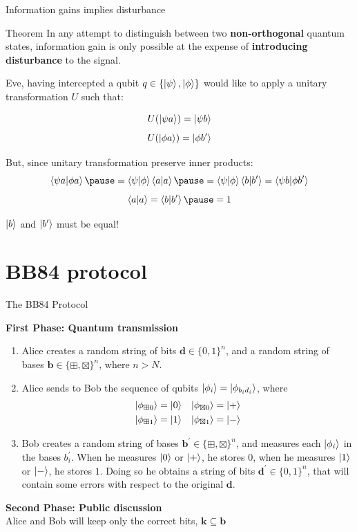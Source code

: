 \documentclass{beamer}
\newcommand{\comp}{\boxplus}
\newcommand{\diag}{\boxtimes}
\newcommand{\kz}{\ket{0}}
\newcommand{\ko}{\ket{1}}
\newcommand{\kpl}{\ket{+}}
\newcommand{\km}{\ket{-}}
\begin{document}
\begin{frame}{Information gains implies disturbance}
	
	\begin{block}{Theorem}
	In any attempt to
distinguish between two \textbf{non-orthogonal} quantum states, information gain is only
possible at the expense of \textbf{introducing disturbance} to the signal.

	\end{block}	
	
	Eve, having intercepted a qubit $q \in \{\ket{\psi}, \ket{\phi}\}$  would like to apply a unitary transformation  $U$ such that:
	
	\[
		U(\ket{\psi a}) = \ket{\psi b}
	\]\[
		U(\ket{\phi a}) = \ket{\phi b^\prime}
	\]
	
	\pause
	But, since unitary transformation preserve inner products:
	\[
	\braket{\psi a | \phi a} \pause = 
	\braket{\psi|\phi}\braket{a|a} \pause =
	\braket{\psi|\phi}\braket{b|b^\prime} = 
	\braket{\psi b|\phi b^\prime}
	\]
	\pause
	\vspace*{-0.5cm}
	\[
	\braket{a|a} = \braket{b|b^\prime} \pause = 1
	\]
	\pause
	\vspace*{-0.6cm}
	\begin{center}
	$\ket{b}$ and $\ket{b^\prime}$ must be equal!
	\end{center}
	\end{frame}

\section{BB84 protocol}
\begin{frame}{The BB84 Protocol}%

	\textbf{First Phase: Quantum transmission}
	\begin{enumerate}
		\item Alice creates a random string of bits $\mathbf{d} \in \{0, 1\}^n$, and a random string of bases $\mathbf{b} \in \{\boxplus, \boxtimes\}^n$, where $n > N$.
		\pause\item Alice sends to Bob the sequence of qubits $\ket{\phi_{i}} = \ket{\phi_{b_id_i}}$, where		
	\begin{align*}
		&\ket{\phi_{\comp 0}} = \ket{0}  &\ket{\phi_{\diag 0}} = \ket{+} \\
		&\ket{\phi_{\comp 1}} = \ket{1}  &\ket{\phi_{\diag 1}} = \ket{-}
	\end{align*}				
		\pause\item Bob creates a random string of bases $\mathbf{b}^\prime \in \{\comp, \diag\}^n$, and measures each $\ket{\phi_i}$ in the bases $b_i^\prime$. When he measures $\kz$ or $\kpl$, he stores $0$, when he measures $\ko$ or $\km$, he stores $1$. Doing so he obtains a string of bits $\mathbf{d}^\prime \in \{0, 1\}^n$, that will contain some errors with respect to the original $\mathbf{d}$.
	\end{enumerate}
	
	\textbf{Second Phase: Public discussion}	\\
	\hspace{5pt} Alice and Bob will keep only the correct bits, $\mathbf{k} \subseteq \mathbf{b}$
\end{frame}
\end{document}
